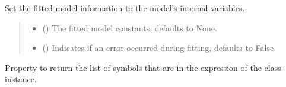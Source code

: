 \documentclass[letterpaper,10pt,english]{sphinxmanual}
\begin{document}
\begin{fulllineitems}
\begin{fulllineitems}
\label{\detokenize{VPCModel:src.VPCModel.VPCModel.set_fit_information}}
\pysigstartsignatures
{}
\pysigstopsignatures
\sphinxAtStartPar
Set the fitted model information to the model’s internal variables.
\begin{quote}\begin{description}
\begin{itemize}
\item {} 
\sphinxAtStartPar
{} (\sphinxstyleliteralemphasis{\sphinxupquote{{[}}}\sphinxstyleliteralemphasis{\sphinxupquote{, }}\sphinxstyleliteralemphasis{\sphinxupquote{{]}}}) \textendash{} The fitted model constants, defaults to None.

\item {} 
\sphinxAtStartPar
{} () \textendash{} Indicates if an error occurred during fitting, defaults to False.

\end{itemize}

\end{description}\end{quote}

\end{fulllineitems}


\begin{fulllineitems}
\label{\detokenize{VPCModel:src.VPCModel.VPCModel.symbols}}
\pysigstartsignatures
{}
\pysigstopsignatures
\sphinxAtStartPar
Property to return the list of symbols that are in the expression of the class instance.


\end{fulllineitems}
\end{fulllineitems}
\end{document}
